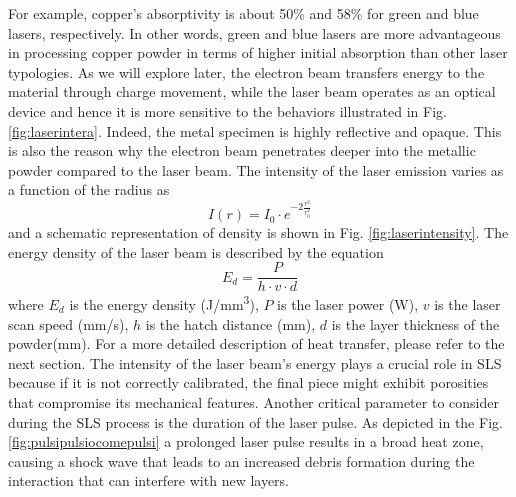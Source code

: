 For example, copper's absorptivity is about 50\% and 58\% for green and blue lasers, respectively. In other words, green and blue lasers are more advantageous in processing copper powder in terms of higher initial absorption than other laser typologies. As we will explore later, the electron beam transfers energy to the material through charge movement, while the laser beam operates as an optical device and hence it is more sensitive to the behaviors illustrated in Fig. \ref{fig:laserintera}. Indeed, the metal specimen is highly reflective and opaque. This is also the reason why the electron beam penetrates deeper into the metallic powder compared to the laser beam. The intensity of the laser emission varies as a function of the radius as 
\begin{equation}
    \label{eq:intensitylaser}
    I(r)=I_0\cdot e^{-2 \frac{r^2}{r_0^2}}
\end{equation}
and a schematic representation of density is shown in Fig. \ref{fig:laserintensity}.
The energy density of the laser beam is described by the equation
\begin{equation}
    \label{eq:energydensity}
    E_d = \frac{P}{h\cdot v \cdot d}
\end{equation}
where $E_d$ is the energy density (\unit{\joule/\milli\metre^3}), $P$ is the laser power (\unit{\watt}), $v$ is the laser scan speed (\unit{\milli\metre / \second}), $h$ is the hatch distance (\unit{\milli\metre}), $d$ is the layer thickness of the powder(\unit{\milli\metre}). For a more detailed description of heat transfer, please refer to the next section. The intensity of the laser beam's energy plays a crucial role in SLS because if it is not correctly calibrated, the final piece might exhibit porosities that compromise its mechanical features. Another critical parameter to consider during the SLS process is the duration of the laser pulse. As depicted in the Fig. \ref{fig:pulsipulsiocomepulsi} a prolonged laser pulse results in a broad heat zone, causing a shock wave that leads to an increased debris formation during the interaction that can interfere with new layers.
